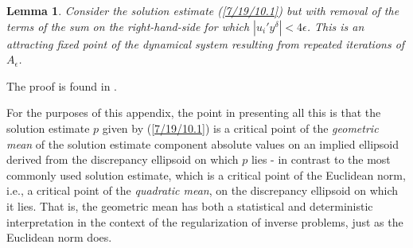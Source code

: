 \documentclass{amsart}
\numberwithin{equation}{section}
\newtheorem{lemma}[theorem]{Lemma}
\theoremstyle{definition}
\numberwithin{theorem}{section}
\begin{document}
\begin{lemma} \label{7/6/21.9} Consider the solution estimate (\ref{7/19/10.1}) but with removal of the terms of the sum on the right-hand-side for which $|u_i'y^\delta|<4\epsilon$.  This is an attracting fixed point of the dynamical system resulting from repeated iterations of $A_\epsilon$. \end{lemma}

The proof is found in \cite{fgreensite:2022d}.

For the purposes of this appendix, the point in presenting all this is that the solution estimate $p$ given by (\ref{7/19/10.1}) is a critical point of the {\it geometric mean} of the solution estimate component absolute values on an implied ellipsoid  derived from the discrepancy ellipsoid on which $p$ lies - in contrast to the most commonly used solution estimate, which is a critical point of the Euclidean norm, i.e., a critical point of the {\it quadratic mean}, on the discrepancy ellipsoid on which it lies.  That is, the geometric mean has both a statistical and deterministic interpretation in the context of the regularization of inverse problems, just as the Euclidean norm does. 
 
\end{document}
